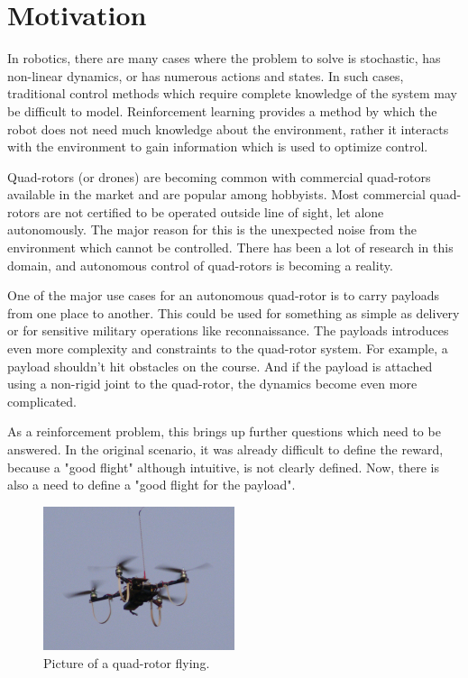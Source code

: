 \documentclass[hidelinks,BTech]{iitmdiss}
\begin{document}
\section{Motivation}

In robotics, there are many cases where the problem to solve is stochastic, has non-linear dynamics, or has numerous actions and states. In such cases, traditional control methods which require complete knowledge of the system may be difficult to model. Reinforcement learning provides a method by which the robot does not need much knowledge about the environment, rather it interacts with the environment to gain information which is used to optimize control.

Quad-rotors (or drones) are becoming common with commercial quad-rotors available in the market and are popular among hobbyists. Most commercial quad-rotors are not certified to be operated outside line of sight, let alone autonomously. The major reason for this is the unexpected noise from the environment which cannot be controlled. There has been a lot of research in this domain, and autonomous control of quad-rotors is becoming a reality.

One of the major use cases for an autonomous quad-rotor is to carry payloads from one place to another. This could be used for something as simple as delivery or for sensitive military operations like reconnaissance. The payloads introduces even more complexity and constraints to the quad-rotor system. For example, a payload shouldn't hit obstacles on the course. And if the payload is attached using a non-rigid joint to the quad-rotor, the dynamics become even more complicated.

As a reinforcement problem, this brings up further questions which need to be answered. In the original scenario, it was already difficult to define the reward, because a "good flight" although intuitive, is not clearly defined. Now, there is also a need to define a "good flight for the payload".

\begin{figure}[H]
  \centering
    \includegraphics[width=0.5\textwidth]{quadrotor.jpg}
    \caption{Picture of a quad-rotor flying.}
\end{figure}
\end{document}
